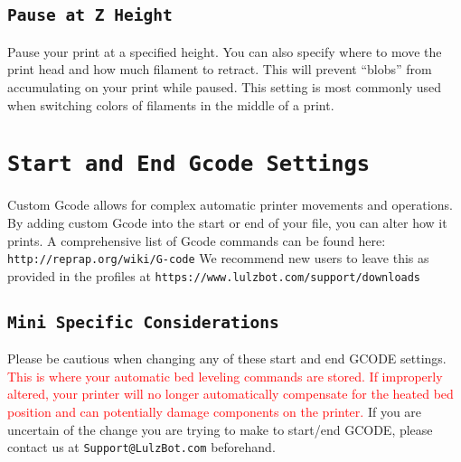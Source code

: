 \subsection{\texttt{Pause at Z Height}}
Pause your print at a specified height. You can also specify where to move the print head and how much filament to retract. This will prevent “blobs” from accumulating on your print while paused. This setting is most commonly used when switching colors of filaments in the middle of a print.

\section{\texttt{Start and End Gcode Settings}}
Custom Gcode allows for complex automatic printer movements and operations. By adding custom Gcode into the start or end of your file, you can alter how it prints. A comprehensive list of Gcode commands can be found here: \texttt{http://reprap.org/wiki/G-code} We recommend new users to leave this as provided in the profiles at \texttt{https://www.lulzbot.com/support/downloads}

\subsection{\texttt{Mini Specific Considerations}}
Please be cautious when changing any of these start and end GCODE settings. \textcolor{red}{This is where your automatic bed leveling commands are stored. If improperly altered, your printer will no longer automatically compensate for the heated bed position and can potentially damage components on the printer.} If you are uncertain of the change you are trying to make to start/end GCODE, please contact us at \texttt{Support@LulzBot.com} beforehand.



